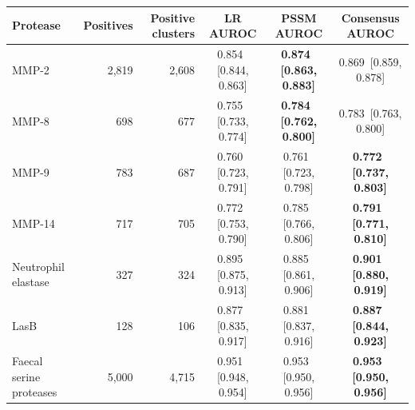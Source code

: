 {\footnotesize\begin{tabular}{@{}lrrccc@{}}\toprule
Protease & Positives & Positive clusters & LR AUROC & PSSM AUROC & Consensus AUROC \\\midrule
MMP-2 & 2,819 & 2,608 & 0.854 \,[0.844, 0.863] & \textbf{0.874 \,[0.863, 0.883]} & 0.869 \,[0.859, 0.878] \\
MMP-8 & 698 & 677 & 0.755 \,[0.733, 0.774] & \textbf{0.784 \,[0.762, 0.800]} & 0.783 \,[0.763, 0.800] \\
MMP-9 & 783 & 687 & 0.760 \,[0.723, 0.791] & 0.761 \,[0.723, 0.798] & \textbf{0.772 \,[0.737, 0.803]} \\
MMP-14 & 717 & 705 & 0.772 \,[0.753, 0.790] & 0.785 \,[0.766, 0.806] & \textbf{0.791 \,[0.771, 0.810]} \\
Neutrophil elastase & 327 & 324 & 0.895 \,[0.875, 0.913] & 0.885 \,[0.861, 0.906] & \textbf{0.901 \,[0.880, 0.919]} \\
LasB & 128 & 106 & 0.877 \,[0.835, 0.917] & 0.881 \,[0.837, 0.916] & \textbf{0.887 \,[0.844, 0.923]} \\
Faecal serine proteases & 5,000 & 4,715 & 0.951 \,[0.948, 0.954] & 0.953 \,[0.950, 0.956] & \textbf{0.953 \,[0.950, 0.956]} \\
\bottomrule\end{tabular}}

